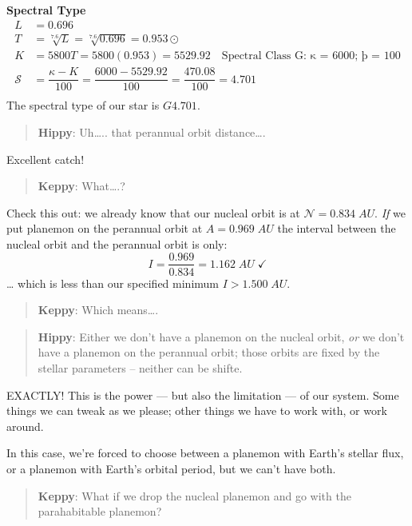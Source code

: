 \documentclass[
  letterpaper,
]{book}
\begin{document}
\textbf{Spectral Type} \[
\begin{align}
L &= 0.696 \\
T &= \sqrt[7.6]{L} = \sqrt[7.6]{0.696} = 0.953\odot \\
K &= 5800T = 5800(0.953) = 5529.92 \quad \text{Spectral Class G: κ = 6000; þ = 100} \\[2em]
\mathcal{S} &= \dfrac{\kappa - K}{100} = \dfrac{6000 - 5529.92}{100} = \dfrac{470.08}{100} = 4.701\\
\end{align}
\] The spectral type of our star is \(G4.701\).

\begin{quote}
\textbf{Hippy}: Uh\ldots.. that perannual orbit distance\ldots.
\end{quote}

Excellent catch!

\begin{quote}
\textbf{Keppy}: What\ldots.?
\end{quote}

Check this out: we already know that our nucleal orbit is at
\(\mathcal{N} = 0.834\;AU\). \emph{If} we put planemon on the perannual
orbit at \(A = 0.969\;AU\) the interval between the nucleal orbit and
the perannual orbit is only: \[
I = \dfrac{0.969}{0.834} = 1.162\;AU\;✓
\] \ldots{} which is less than our specified minimum \(I > 1.500\;AU\).

\begin{quote}
\textbf{Keppy}: Which means\ldots.
\end{quote}

\begin{quote}
\textbf{Hippy}: Either we don't have a planemon on the nucleal orbit,
\emph{or} we don't have a planemon on the perannual orbit; those orbits
are fixed by the stellar parameters -- neither can be shifte.
\end{quote}

EXACTLY! This is the power --- but also the limitation --- of our
system. Some things we can tweak as we please; other things we have to
work with, or work around.

In this case, we're forced to choose between a planemon with Earth's
stellar flux, or a planemon with Earth's orbital period, but we can't
have both.

\begin{quote}
\textbf{Keppy}: What if we drop the nucleal planemon and go with the
parahabitable planemon?
\end{quote}
\end{document}
